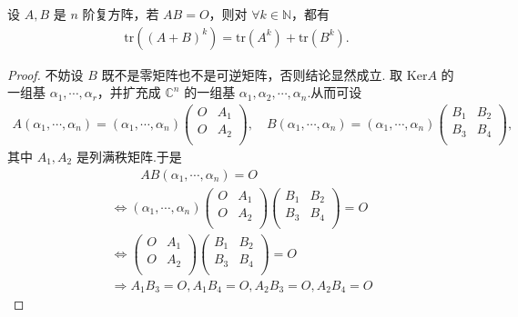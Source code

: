 \documentclass[../../main.tex]{subfiles}
\begin{document}
\begin{example}
设 $A,B$ 是 $n$ 阶复方阵，若 $AB=O$，则对 $\forall k\in \mathbb{N}$，都有
\begin{align*}
\mathrm{tr}\left( \left( A+B \right) ^k \right) =\mathrm{tr}\left( A^k \right) +\mathrm{tr}\left( B^k \right) .
\end{align*}
\end{example}
\begin{proof}
不妨设 $B$ 既不是零矩阵也不是可逆矩阵，否则结论显然成立.
取 $\mathrm{Ker}A$ 的一组基 $\alpha _1,\cdots ,\alpha _r$，并扩充成 $\mathbb{C} ^n$ 的一组基 $\alpha _1,\alpha _2,\cdots ,\alpha _n$.从而可设
\begin{align*}
A\left( \alpha _1,\cdots ,\alpha _n \right) =\left( \alpha _1,\cdots ,\alpha _n \right) \begin{pmatrix}
O&		A_1\\
O&		A_2\\
\end{pmatrix}, \quad B\left( \alpha _1,\cdots ,\alpha _n \right) =\left( \alpha _1,\cdots ,\alpha _n \right) \begin{pmatrix}
B_1&		B_2\\
B_3&		B_4\\
\end{pmatrix},
\end{align*}
其中 $A_1,A_2$ 是列满秩矩阵.于是
\begin{align*}
&\quad \quad \,\, AB\left( \alpha _1,\cdots ,\alpha _n \right) =O\\
&\Longleftrightarrow \left( \alpha _1,\cdots ,\alpha _n \right) \begin{pmatrix}
O&		A_1\\
O&		A_2\\
\end{pmatrix} \begin{pmatrix}
B_1&		B_2\\
B_3&		B_4\\
\end{pmatrix} =O
\\
&\Longleftrightarrow \begin{pmatrix}
O&		A_1\\
O&		A_2\\
\end{pmatrix} \begin{pmatrix}
B_1&		B_2\\
B_3&		B_4\\
\end{pmatrix} =O
\\
&\Longrightarrow A_1B_3=O,A_1B_4=O,A_2B_3=O,A_2B_4=O

\end{align*}
\end{proof}
\end{document}
